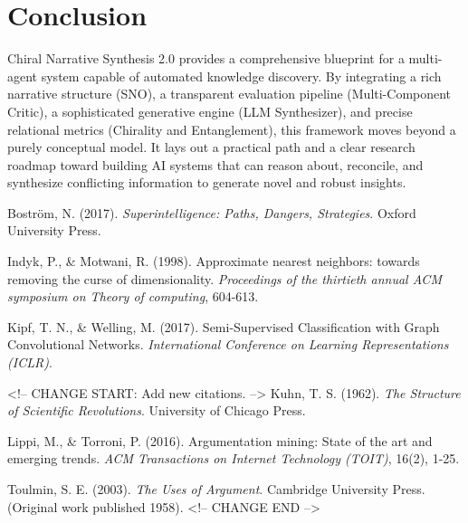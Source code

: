 \documentclass[12pt, a4paper]{article}
\begin{document}
\section{Conclusion}
Chiral Narrative Synthesis 2.0 provides a comprehensive blueprint for a multi-agent system capable of automated knowledge discovery. By integrating a rich narrative structure (SNO), a transparent evaluation pipeline (Multi-Component Critic), a sophisticated generative engine (LLM Synthesizer), and precise relational metrics (Chirality and Entanglement), this framework moves beyond a purely conceptual model. It lays out a practical path and a clear research roadmap toward building AI systems that can reason about, reconcile, and synthesize conflicting information to generate novel and robust insights.


\begin{thebibliography}{1}

Boström, N. (2017).
\textit{Superintelligence: Paths, Dangers, Strategies}.
Oxford University Press.

Indyk, P., \& Motwani, R. (1998).
Approximate nearest neighbors: towards removing the curse of dimensionality.
\textit{Proceedings of the thirtieth annual ACM symposium on Theory of computing}, 604-613.

Kipf, T. N., \& Welling, M. (2017).
Semi-Supervised Classification with Graph Convolutional Networks.
\textit{International Conference on Learning Representations (ICLR)}.

<!-- CHANGE START: Add new citations. -->
Kuhn, T. S. (1962).
\textit{The Structure of Scientific Revolutions}.
University of Chicago Press.

Lippi, M., \& Torroni, P. (2016).
Argumentation mining: State of the art and emerging trends.
\textit{ACM Transactions on Internet Technology (TOIT)}, 16(2), 1-25.

Toulmin, S. E. (2003).
\textit{The Uses of Argument}.
Cambridge University Press. (Original work published 1958).
<!-- CHANGE END -->

\end{thebibliography}
\end{document}
